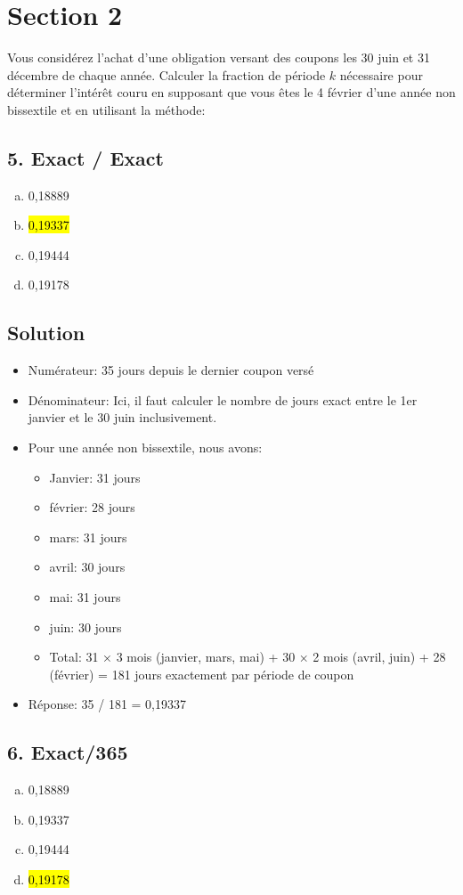 \documentclass[10pt,a4paper]{article}
\begin{document}
\newpage

\section*{Section 2}
Vous considérez l’achat d’une obligation versant des coupons les 30 juin et 31 décembre de chaque année. Calculer la fraction de période $k$ nécessaire pour déterminer l’intérêt couru en supposant que vous êtes le 4 février d’une année non bissextile et en utilisant la méthode:


\subsection*{5.  Exact / Exact} 
\begin{enumerate}[a)]
\item 0,18889
\item \hl{0,19337}
\item 0,19444
\item 0,19178
\end{enumerate}

\subsection*{Solution}
\begin{itemize}
\item Numérateur: 35 jours depuis le dernier coupon versé
\item Dénominateur: Ici, il faut calculer le nombre de jours exact entre le 1er janvier et le 30 juin inclusivement. 
\item Pour une année non bissextile, nous avons: 
\begin{itemize}
\item Janvier: 31 jours
\item février: 28 jours
\item mars: 31 jours
\item avril: 30 jours
\item mai: 31 jours
\item juin: 30 jours
\item Total: 31 × 3 mois (janvier, mars, mai) + 30 × 2 mois (avril, juin) + 28 (février) = 181 jours exactement par période de coupon
\end{itemize}
\item Réponse: 35 / 181 = 0,19337
\end{itemize}

\newpage 

\subsection*{6.  Exact/365} 
\begin{enumerate}[a)]
\item 0,18889
\item 0,19337
\item 0,19444
\item \hl{0,19178}
\end{enumerate}
\end{document}

